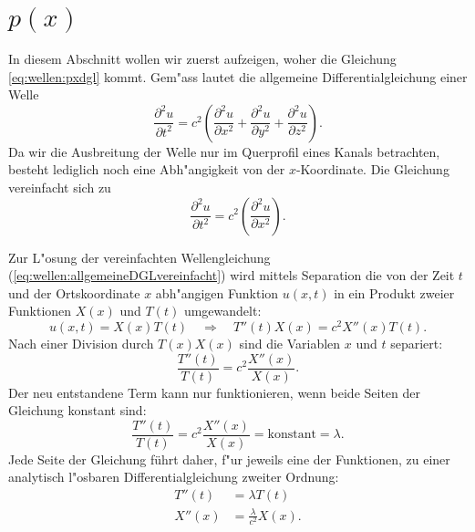 \section{\texorpdfstring{$p(x)$}{p(x)}}
In diesem Abschnitt wollen wir zuerst aufzeigen, woher die Gleichung 
\ref{eq:wellen:pxdgl} kommt. Gem"ass \cite{wellen:smirnow2} lautet 
die allgemeine Differentialgleichung einer Welle
%
\begin{equation*}
	\frac{\partial^2 u}{\partial t^2}
	=
	c^2
	\left(
		\frac{\partial^2 u}{\partial x^2} 
		+ \frac{\partial^2 u}{\partial y^2} 
		+ \frac{\partial^2 u}{\partial z^2}
	\right).
	\label{eq:wellen:allgemeineDGL}
\end{equation*}
Da wir die Ausbreitung der Welle nur im Querprofil eines Kanals betrachten, 
besteht lediglich noch eine Abh"angigkeit von der $x$-Koordinate. Die Gleichung 
vereinfacht sich zu
\begin{equation}
	\frac{\partial^2 u}{\partial t^2}
	=
	c^2
	\left(
		\frac{\partial^2 u}{\partial x^2} 
	\right).
	\label{eq:wellen:allgemeineDGLvereinfacht}
\end{equation}

Zur L"osung der vereinfachten Wellengleichung 
(\ref{eq:wellen:allgemeineDGLvereinfacht}) wird mittels Separation die von der 
Zeit $t$ und der Ortskoordinate $x$ abh"angigen Funktion $u(x,t)$ in ein 
Produkt zweier Funktionen $X(x)$ und $T(t)$ umgewandelt:
\begin{equation*}
	u (x,t) = X(x) T(t)
	\quad
	\Rightarrow\quad T''(t) X(x) = c^2 X''(x)T(t).
\end{equation*}
Nach einer Division durch $T(x)X(x)$ sind die Variablen $x$ und $t$ separiert:
\begin{equation*}
	\frac{T''(t)}{T(t)}
	=
	c^2 \frac{X''(x)}{X(x)}.
\end{equation*}
Der neu entstandene Term kann nur funktionieren, wenn beide Seiten der 
Gleichung konstant sind:
\begin{equation*}
	\frac{T''(t)}{T(t)}
	=
	c^2 \frac{X''(x)}{X(x)} = \text{konstant} = \lambda.
\end{equation*}
Jede Seite der Gleichung führt daher, f"ur jeweils eine der Funktionen, zu 
einer analytisch l"osbaren Differentialgleichung zweiter Ordnung:
\begin{align*}
	T''(t) &= \lambda T(t) \\
	X''(x) &= \frac{\lambda}{c^2}X(x).
\end{align*}

